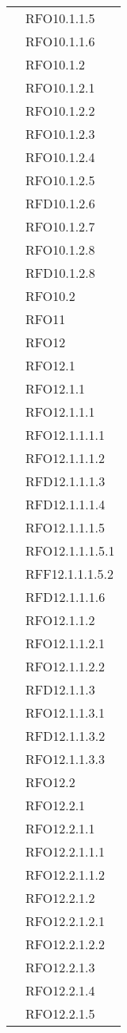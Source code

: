 \begin{longtable}{ p{12cm} | p{4cm} }
			& RFO10.1.1.5 \\
			& RFO10.1.1.6 \\
			& RFO10.1.2 \\
			& RFO10.1.2.1 \\
			& RFO10.1.2.2 \\
			& RFO10.1.2.3 \\
			& RFO10.1.2.4 \\
			& RFO10.1.2.5 \\
			& RFD10.1.2.6 \\
			& RFO10.1.2.7 \\
			& RFO10.1.2.8 \\
			& RFD10.1.2.8 \\
			& RFO10.2 \\
			& RFO11 \\
			& RFO12 \\
			& RFO12.1 \\
			& RFO12.1.1 \\
			& RFO12.1.1.1 \\
			& RFO12.1.1.1.1 \\
			& RFO12.1.1.1.2 \\
			& RFD12.1.1.1.3 \\
			& RFD12.1.1.1.4 \\
			& RFO12.1.1.1.5 \\
			& RFO12.1.1.1.5.1 \\
			& RFF12.1.1.1.5.2 \\
			& RFD12.1.1.1.6 \\
			& RFO12.1.1.2 \\
			& RFO12.1.1.2.1 \\
			& RFO12.1.1.2.2 \\
			& RFD12.1.1.3 \\
			& RFO12.1.1.3.1 \\
			& RFD12.1.1.3.2 \\
			& RFO12.1.1.3.3 \\
			& RFO12.2 \\
			& RFO12.2.1 \\
			& RFO12.2.1.1 \\
			& RFO12.2.1.1.1 \\
			& RFO12.2.1.1.2 \\
			& RFO12.2.1.2 \\
			& RFO12.2.1.2.1 \\
			& RFO12.2.1.2.2 \\
			& RFO12.2.1.3 \\
			& RFO12.2.1.4 \\
			& RFO12.2.1.5 \\

\end{longtable}
